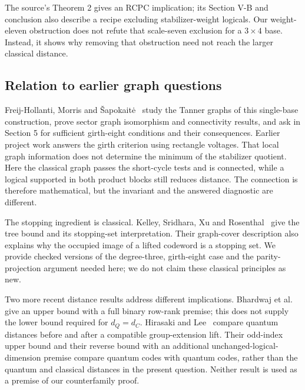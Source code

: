 \documentclass[11pt]{article}
\theoremstyle{definition}\newtheorem{definition}[theorem]{Definition}
\begin{document}
The source's Theorem 2 gives an RCPC implication; its Section V-B and
conclusion also describe a recipe excluding stabilizer-weight logicals.
Our weight-eleven obstruction does not refute that scale-seven exclusion
for a $3\times4$ base. Instead, it shows why removing that obstruction
need not reach the larger classical distance.

\subsection*{Relation to earlier graph questions}
Freij-Hollanti, Morris and \v Sapokait\.{e}~\cite{FHM} study the Tanner
graphs of this single-base construction, prove sector graph isomorphism
and connectivity results, and ask in Section 5 for sufficient girth-eight
conditions and their consequences. Earlier project work answers the
girth criterion using rectangle voltages. That local graph information
does not determine the minimum of the stabilizer quotient. Here the
classical graph passes the short-cycle tests and is connected, while a
logical supported in both product blocks still reduces distance.
The connection is therefore mathematical, but the invariant and the
answered diagnostic are different.

The stopping ingredient is classical. Kelley, Sridhara, Xu and
Rosenthal~\cite[Theorem III.1 and the following note]{Kelley} give the
tree bound and its stopping-set interpretation. Their graph-cover
description also explains why the occupied image of a lifted codeword
is a stopping set. We provide checked versions of the degree-three,
girth-eight case and the parity-projection argument needed here; we
do not claim these classical principles as new.

Two more recent distance results address different implications.
Bhardwaj et al.~\cite[Appendix G, Theorem 8]{Bhardwaj} give an
upper bound with a full binary row-rank premise; this does not supply
the lower bound required for $d_Q=d_C$. Hirasaki and
Lee~\cite[Corollary 6]{Hirasaki} compare quantum distances before and
after a compatible group-extension lift. Their odd-index upper bound
and their reverse bound with an additional unchanged-logical-dimension
premise compare quantum codes with quantum codes, rather than the
quantum and classical distances in the present question. Neither
result is used as a premise of our counterfamily proof.
\end{document}
